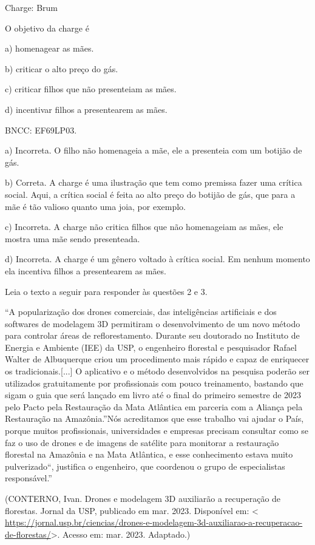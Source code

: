 Charge: Brum

O objetivo da charge é

a) homenagear as mães.

b) criticar o alto preço do gás.

c) criticar filhos que não presenteiam as mães.

d) incentivar filhos a presentearem as mães.

BNCC: EF69LP03.

a) Incorreta. O filho não homenageia a mãe, ele a presenteia com um
botijão de gás.

b) Correta. A charge é uma ilustração que tem como premissa fazer uma
crítica social. Aqui, a crítica social é feita ao alto preço do botijão
de gás, que para a mãe é tão valioso quanto uma joia, por exemplo.

c) Incorreta. A charge não critica filhos que não homenageiam as mães,
ele mostra uma mãe sendo presenteada.

d) Incorreta. A charge é um gênero voltado à crítica social. Em nenhum
momento ela incentiva filhos a presentearem as mães.

Leia o texto a seguir para responder às questões 2 e 3.

``A popularização dos drones comerciais, das inteligências artificiais e
dos softwares de modelagem 3D permitiram o desenvolvimento de um novo
método para controlar áreas de reflorestamento. Durante seu doutorado no
Instituto de Energia e Ambiente (IEE) da USP, o engenheiro florestal e
pesquisador Rafael Walter de Albuquerque criou um procedimento mais
rápido e capaz de enriquecer os tradicionais.{[}...{]} O aplicativo e o
método desenvolvidos na pesquisa poderão ser utilizados gratuitamente
por profissionais com pouco treinamento, bastando que sigam o guia que
será lançado em livro até o final do primeiro semestre de 2023 pelo
Pacto pela Restauração da Mata Atlântica em parceria com a Aliança pela
Restauração na Amazônia.''Nós acreditamos que esse trabalho vai ajudar o
País, porque muitos profissionais, universidades e empresas precisam
consultar como se faz o uso de drones e de imagens de satélite para
monitorar a restauração florestal na Amazônia e na Mata Atlântica, e
esse conhecimento estava muito pulverizado``, justifica o engenheiro,
que coordenou o grupo de especialistas responsável.''

(CONTERNO, Ivan. Drones e modelagem 3D auxiliarão a recuperação de
florestas. Jornal da USP, publicado em mar. 2023. Disponível em:
\textless{}
\url{https://jornal.usp.br/ciencias/drones-e-modelagem-3d-auxiliarao-a-recuperacao-de-florestas/}\textgreater.
Acesso em: mar. 2023. Adaptado.)

